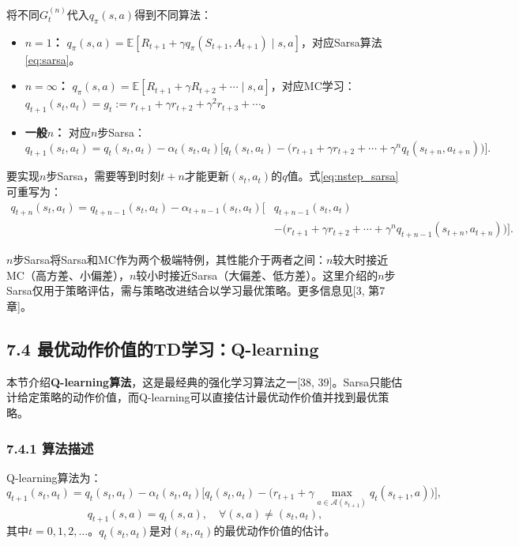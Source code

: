 \documentclass[UTF8]{article}
\begin{document}
将不同$G_t^{(n)}$代入$q_\pi(s, a)$得到不同算法：
\begin{itemize}
    \item \textbf{$n = 1$：} $q_\pi(s, a) = \mathbb{E}[R_{t+1} + \gamma q_\pi(S_{t+1}, A_{t+1}) \mid s, a]$，对应Sarsa算法\eqref{eq:sarsa}。
    \item \textbf{$n = \infty$：} $q_\pi(s, a) = \mathbb{E}[R_{t+1} + \gamma R_{t+2} + \cdots \mid s, a]$，对应MC学习：$q_{t+1}(s_t, a_t) = g_t := r_{t+1} + \gamma r_{t+2} + \gamma^2 r_{t+3} + \cdots$。
    \item \textbf{一般$n$：} 对应$n$步Sarsa：
    \begin{equation}
    q_{t+1}(s_t, a_t) = q_t(s_t, a_t) - \alpha_t(s_t, a_t)\Big[q_t(s_t, a_t) - \big(r_{t+1} + \gamma r_{t+2} + \cdots + \gamma^n q_t(s_{t+n}, a_{t+n})\big)\Big].
    \label{eq:nstep_sarsa}
    \end{equation}
\end{itemize}

要实现$n$步Sarsa，需要等到时刻$t+n$才能更新$(s_t, a_t)$的$q$值。式\eqref{eq:nstep_sarsa}可重写为：
\[
\begin{aligned}
q_{t+n}(s_t, a_t) = q_{t+n-1}(s_t, a_t) - \alpha_{t+n-1}(s_t, a_t)\Big[&q_{t+n-1}(s_t, a_t) \\
&- \big(r_{t+1} + \gamma r_{t+2} + \cdots + \gamma^n q_{t+n-1}(s_{t+n}, a_{t+n})\big)\Big].
\end{aligned}
\]

$n$步Sarsa将Sarsa和MC作为两个极端特例，其性能介于两者之间：$n$较大时接近MC（高方差、小偏差），$n$较小时接近Sarsa（大偏差、低方差）。这里介绍的$n$步Sarsa仅用于策略评估，需与策略改进结合以学习最优策略。更多信息见[3, 第7章]。

\subsection*{7.4 最优动作价值的TD学习：Q-learning}

本节介绍\textbf{Q-learning算法}，这是最经典的强化学习算法之一[38, 39]。Sarsa只能估计给定策略的动作价值，而Q-learning可以直接估计最优动作价值并找到最优策略。

\subsubsection*{7.4.1 算法描述}

Q-learning算法为：
\begin{equation}
q_{t+1}(s_t, a_t) = q_t(s_t, a_t) - \alpha_t(s_t, a_t)\Big[q_t(s_t, a_t) - \big(r_{t+1} + \gamma \max_{a \in \mathcal{A}(s_{t+1})} q_t(s_{t+1}, a)\big)\Big],
\label{eq:qlearning}
\end{equation}
\[
q_{t+1}(s, a) = q_t(s, a), \quad \forall (s, a) \neq (s_t, a_t),
\]
其中$t = 0, 1, 2, \dots$。$q_t(s_t, a_t)$是对$(s_t, a_t)$的最优动作价值的估计。
\end{document}
